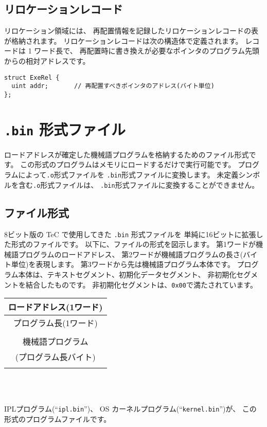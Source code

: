 \subsection{リロケーションレコード}

リロケーション領域には、
再配置情報を記録したリロケーションレコードの表が格納されます。
リロケーションレコードは次の構造体で定義されます。
レコードは 1 ワード長で、
再配置時に書き換えが必要なポインタのプログラム先頭からの相対アドレスです。

\begin{mylist}
\begin{verbatim}
struct ExeRel {
  uint addr;       // 再配置すべきポインタのアドレス(バイト単位)
};
\end{verbatim}
\end{mylist}

\section{{\tt .bin} 形式ファイル}
\label{app:bformat}

ロードアドレスが確定した機械語プログラムを格納するためのファイル形式です。
この形式のプログラムはメモリにロードするだけで実行可能です。
{\objbin}プログラムによって{\tt .o}形式ファイルを
{\tt .bin}形式ファイルに変換します。
未定義シンボルを含む{\tt .o}形式ファイルは、
{\tt .bin}形式ファイルに変換することができません。

\subsection{ファイル形式}

8ビット版の TeC で使用してきた {\tt .bin} 形式ファイルを
単純に16ビットに拡張した形式のファイルです。
以下に、ファイルの形式を図示します。
第1ワードが機械語プログラムのロードアドレス、
第2ワードが機械語プログラムの長さ(バイト単位)を表現します。
第3ワードから先は機械語プログラム本体です。
プログラム本体は、テキストセグメント、初期化データセグメント、
非初期化セグメントを結合したものです。
非初期化セグメントは、\verb/0x00/で満たされています。

\begin{myminipage}
\begin{tabular}{|c|}
\hline
ロードアドレス(1ワード) \\
\hline
プログラム長(1ワード) \\
\hline
\\
機械語プログラム \\
(プログラム長バイト)\\
\\
\hline
\end{tabular}
\\ \\
\end{myminipage}

IPLプログラム(``{\tt ipl.bin}'')、
OS カーネルプログラム(``{\tt kernel.bin}'')が、
この形式のプログラムファイルです。
